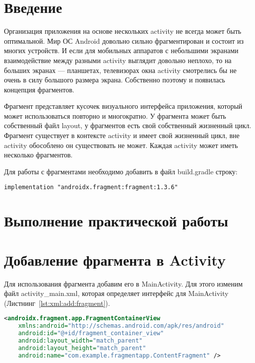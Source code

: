 \graphicspath{{./eighth/img}}

\section*{\LARGE{Введение}}
Организация приложения на основе нескольких activity не всегда может быть
оптимальной. Мир ОС Android довольно сильно фрагментирован и состоит
из многих устройств. И если для мобильных аппаратов с небольшими
экранами взаимодействие между разными activity выглядит довольно
неплохо, то на больших экранах --- планшетах, телевизорах окна activity
смотрелись бы не очень в силу большого размера экрана. Собственно
поэтому и появилась концепция фрагментов.\par
Фрагмент представляет кусочек визуального интерфейса приложения,
который может использоваться повторно и многократно. У фрагмента может
быть собственный файл layout, у фрагментов есть свой собственный
жизненный цикл. Фрагмент существует в контексте activity и имеет свой
жизненный цикл, вне activity обособлено он существовать не может. Каждая
activity может иметь несколько фрагментов.\par
Для работы с фрагментами необходимо добавить в файл build.gradle строку:

\begin{verbatim}
implementation "androidx.fragment:fragment:1.3.6"
\end{verbatim}

\clearpage

\section*{\LARGE{Выполнение практической работы}}

\section{Добавление фрагмента в Activity}
Для использования фрагмента добавим его в MainActivity. Для этого
изменим файл activity\_main.xml, которая определяет интерфейс для
MainActivity (Листнинг~\ref{lst:xml:add:fragment}).
\begin{lstlisting}[language=XML
	, caption=\leftline{}
	, label=lst:xml:add:fragment
	]
<androidx.fragment.app.FragmentContainerView
	xmlns:android="http://schemas.android.com/apk/res/android"
	android:id="@+id/fragment_container_view"
	android:layout_width="match_parent"
	android:layout_height="match_parent"
	android:name="com.example.fragmentapp.ContentFragment" />
\end{lstlisting}

